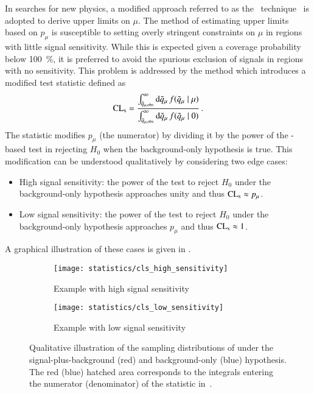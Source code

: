 In searches for new physics, a modified approach referred to as the
\CLs~technique~\cite{Junk:1999kv,Read:2000ru,Read:2002hq} is adopted to derive
upper limits on $\mu$. The method of estimating upper limits based on $p_\mu$ is
susceptible to setting overly stringent constraints on $\mu$ in regions with
little signal sensitivity. While this is expected given a coverage probability
below \SI{100}{\percent}, it is preferred to avoid the spurious exclusion of
signals in regions with no sensitivity. This problem is addressed by the \CLs
method which introduces a modified test statistic defined as~\cite{Cowan:2010js}
\begin{align}
  \text{CL}_{\text{s}} = \frac
  {\int_{\tilde{q}_{\mu, \text{obs}}}^{\infty} \mathrm{d}\tilde{q}_{\mu} \, f(\tilde{q}_{\mu} \mid \mu)}
  {\int_{\tilde{q}_{\mu, \text{obs}}}^\infty \mathrm{d}\tilde{q}_{\mu} \, f(\tilde{q}_{\mu} \mid 0)} \,\text{.}
  \label{eq:cls}
\end{align}
The \CLs statistic modifies $p_\mu$ (the numerator) by dividing it by the power
of the \qmutilde-based test in rejecting $H_0$ when the background-only
hypothesis is true. This modification can be understood qualitatively by
considering two edge cases:
\begin{itemize}

\item High signal sensitivity: the power of the test to reject $H_0$ under the
  background-only hypothesis approaches unity and thus $\text{CL}_{\text{s}} \approx p_\mu$.

\item Low signal sensitivity: the power of the test to reject $H_0$ under the
  background-only hypothesis approaches $p_\mu$ and thus $\text{CL}_{\text{s}} \approx 1$.

\end{itemize}
A graphical illustration of these cases is given in .

\begin{figure}[htbp]
  \centering

  \begin{subfigure}{0.46\textwidth}
    \texttt{[image: statistics/cls\_high\_sensitivity]}
    \caption{Example with high signal sensitivity}
  \end{subfigure}\hfill%
  \begin{subfigure}{0.46\textwidth}
    \texttt{[image: statistics/cls\_low\_sensitivity]}
    \caption{Example with low signal sensitivity}
  \end{subfigure}

  \caption{Qualitative illustration of the sampling distributions of \qmutilde
    under the signal-plus-background (red) and background-only (blue)
    hypothesis. The red (blue) hatched area corresponds to the integrals
    entering the numerator (denominator) of the \CLs statistic
    in~.}%
  \label{fig:cls_qmutilde}
\end{figure}

